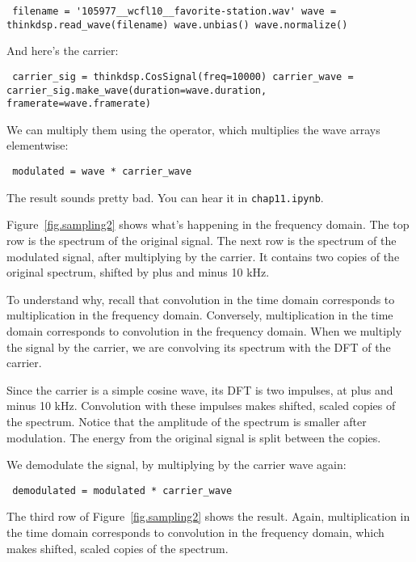 \documentclass[12pt]{book} \usepackage[width=5.5in,height=8.5in, hmarginratio=3:2,vmarginratio=1:1]{geometry}
\begin{document}
\begin{verbatim} filename = '105977__wcfl10__favorite-station.wav' wave = thinkdsp.read_wave(filename) wave.unbias() wave.normalize() \end{verbatim} 

And here's the carrier: 

\begin{verbatim} carrier_sig = thinkdsp.CosSignal(freq=10000) carrier_wave = carrier_sig.make_wave(duration=wave.duration, framerate=wave.framerate) \end{verbatim} 

We can multiply them using the {\tt *} operator, which multiplies the wave arrays elementwise: 

\begin{verbatim} modulated = wave * carrier_wave \end{verbatim} 

The result sounds pretty bad. You can hear it in {\tt chap11.ipynb}. 

Figure~\ref{fig.sampling2} shows what's happening in the frequency domain. The top row is the spectrum of the original signal. The next row is the spectrum of the modulated signal, after multiplying by the carrier. It contains two copies of the original spectrum, shifted by plus and minus 10 kHz. 

To understand why, recall that convolution in the time domain corresponds to multiplication in the frequency domain. Conversely, multiplication in the time domain corresponds to convolution in the frequency domain. When we multiply the signal by the carrier, we are convolving its spectrum with the DFT of the carrier. 

Since the carrier is a simple cosine wave, its DFT is two impulses, at plus and minus 10 kHz. Convolution with these impulses makes shifted, scaled copies of the spectrum. Notice that the amplitude of the spectrum is smaller after modulation. The energy from the original signal is split between the copies. 

We demodulate the signal, by multiplying by the carrier wave again: 

\begin{verbatim} demodulated = modulated * carrier_wave \end{verbatim} 

The third row of Figure~\ref{fig.sampling2} shows the result. Again, multiplication in the time domain corresponds to convolution in the frequency domain, which makes shifted, scaled copies of the spectrum. 
\end{document}
